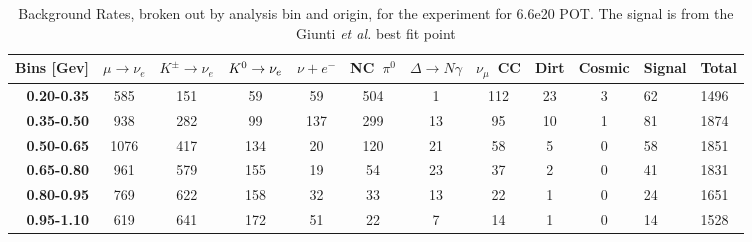 \begin{table}[]
\centering
\small
\caption{Background Rates, broken out by analysis bin and origin, for the \icarus experiment for 6.6e20 POT. The signal is from the Giunti {\em et al.} best fit point}
\begin{tabular}{r|cccccccccll}
\multicolumn{1}{l|}{Bins [Gev]} & \multicolumn{1}{l}{$\mu\rightarrow\nu_e$} & \multicolumn{1}{l}{$K^{\pm}\rightarrow \nu_e$} & \multicolumn{1}{l}{$K^0 \rightarrow \nu_{e}$} & \multicolumn{1}{l}{$\nu + e^-$} & \multicolumn{1}{l}{NC~$\pi^0$} & \multicolumn{1}{l}{$\Delta \rightarrow N\gamma$} & \multicolumn{1}{l}{$\nu_{\mu}$~CC} & \multicolumn{1}{l}{Dirt} & \multicolumn{1}{l}{Cosmic} & Signal & Total \\ \hline
\textbf{0.20-0.35}        & 585                         & 151                         & 59                          & 59                       & 504                        & 1                          & 112                        & 23                       & 3                          & 62     & 1496  \\
\textbf{0.35-0.50}        & 938                         & 282                         & 99                          & 137                      & 299                        & 13                         & 95                         & 10                       & 1                          & 81     & 1874  \\
\textbf{0.50-0.65}        & 1076                        & 417                         & 134                         & 20                       & 120                        & 21                         & 58                         & 5                        & 0                          & 58     & 1851  \\
\textbf{0.65-0.80}        & 961                         & 579                         & 155                         & 19                       & 54                         & 23                         & 37                         & 2                        & 0                          & 41     & 1831  \\
\textbf{0.80-0.95}        & 769                         & 622                         & 158                         & 32                       & 33                         & 13                         & 22                         & 1                        & 0                          & 24     & 1651  \\
\textbf{0.95-1.10}        & 619                         & 641                         & 172                         & 51                       & 22                         & 7                          & 14                         & 1                        & 0                          & 14     & 1528  \\

\end{tabular}
\end{table}
